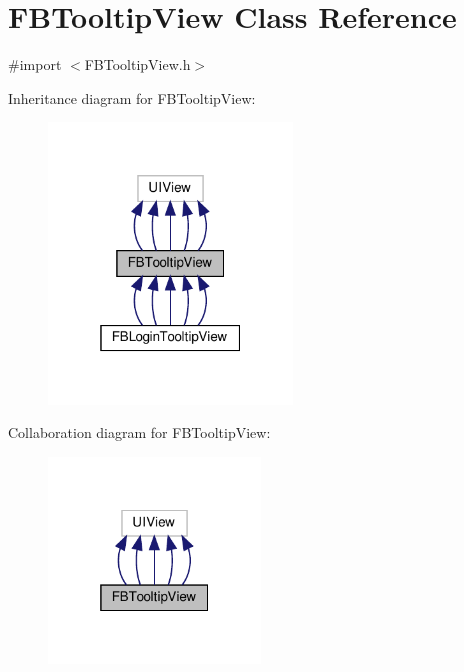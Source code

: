 \hypertarget{interfaceFBTooltipView}{}\section{F\+B\+Tooltip\+View Class Reference}
\label{interfaceFBTooltipView}


{\ttfamily \#import $<$F\+B\+Tooltip\+View.\+h$>$}



Inheritance diagram for F\+B\+Tooltip\+View\+:
\nopagebreak
\begin{figure}[H]
\begin{center}
\leavevmode
\includegraphics[width=184pt]{interfaceFBTooltipView__inherit__graph}
\end{center}
\end{figure}


Collaboration diagram for F\+B\+Tooltip\+View\+:
\nopagebreak
\begin{figure}[H]
\begin{center}
\leavevmode
\includegraphics[width=160pt]{interfaceFBTooltipView__coll__graph}
\end{center}
\end{figure}
